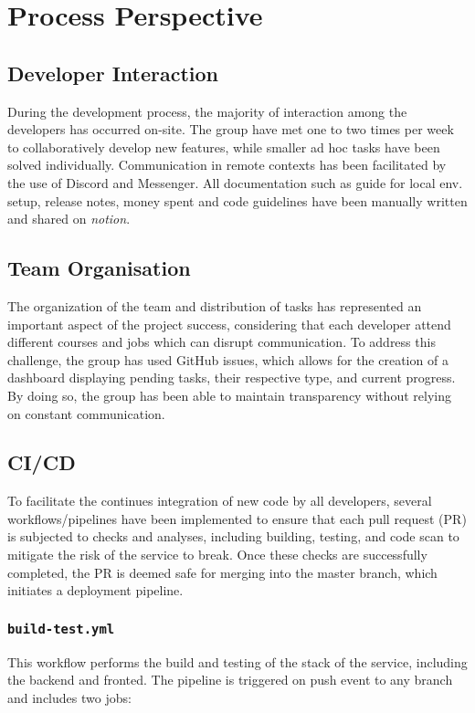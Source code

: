 \chapter{Process Perspective}

\section{Developer Interaction}
During the development process, the majority of interaction among the developers has occurred on-site. The group have met one to two times per week to collaboratively develop new features, while smaller ad hoc tasks have been solved individually. Communication in remote contexts has been facilitated by the use of Discord and Messenger. All documentation such as guide for local env. setup, release notes, money spent and code guidelines have been manually written and shared on \textit{notion}. 

\section{Team Organisation}
The organization of the team and distribution of tasks has represented an important aspect of the project success, considering that each developer attend different courses and jobs which can disrupt communication. To address this challenge, the group has used GitHub issues, which allows for the creation of a dashboard displaying pending tasks, their respective type, and current progress. By doing so, the group has been able to maintain transparency without relying on constant communication.

\section{CI/CD} \label{sec:ci-cd}
To facilitate the continues integration of new code by all developers, several workflows/pipelines have been implemented to ensure that each pull request (PR) is subjected to checks and analyses, including building, testing, and code scan to mitigate the risk of the service to break. Once these checks are successfully completed, the PR is deemed safe for merging into the master branch, which initiates a deployment pipeline. 

\subsection{\texttt{build-test.yml}}
This workflow performs the build and testing of the stack of the service, including the backend and fronted. The pipeline is triggered on push event to any branch and includes two jobs: \\

